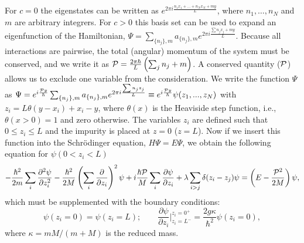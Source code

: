 \documentclass[twocolumn,amsmath,amssymb,showpacs,prl,superscriptaddress,aps]{revtex4-1}
\begin{document}
For $c=0$ the eigenstates can be written as $e^{2\pi i \frac{n_1x_1+\ldots+n_N x_N+my}{L}}$, where $n_1,\ldots,n_N$ and $m$ are arbitrary integrers. 
For $c>0$ this basis set can be used to expand an eigenfunction of the Hamiltonian, $\Psi=\sum_{\{n_j\},m} a_{\{n_j\},m}e^{2\pi i \frac{\sum n_jx_j+my}{L}}$. 
Because all interactions are pairwise, 
the total (angular) momentum of the system must be conserved, and we write it as ${\cal P}=\frac{2\pi\hbar}{L}\left(\sum_{j} n_j+m\right)$.
A conserved quantity (${\cal P}$) allows us to exclude one variable from the consideration. 
We write the function $\Psi$ as $\Psi=e^{i \frac{{\cal P} y}{\hbar}}\sum_{\{n_j\},m} a_{\{n_j\},m}e^{2\pi i \frac{\sum n_jz_j}{L}}\equiv e^{i \frac{{\cal P} y}{\hbar}} \psi(z_1,...,z_N)$ 
with $z_i=L\theta(y-x_i)+x_i-y$, where $\theta(x)$ is the Heaviside step function, i.e., 
$\theta(x>0) = 1$ and zero otherwise. The variables $z_i$ are defined such that $0\leq z_i \leq L$ and the impurity is placed at $z=0$ ($z=L$). Now if we insert this 
function into the Schr{\"o}dinger equation, $H\Psi=E\Psi$, we obtain the following equation for $\psi(0<z_i<L)$
\begin{equation}
-\frac{\hbar^2}{2m}\sum_i\frac{\partial^2 \psi}{\partial z_i^2}-\frac{\hbar^2}{2M}\left(\sum_{i}\frac{\partial }{\partial z_i}\right)^2\psi
+ i \frac{\hbar {\cal P}}{M}\sum_{i}\frac{\partial \psi}{\partial z_i}+\lambda \sum_{i>j}\delta(z_i-z_j)\psi=\left(E-\frac{{\cal P}^2}{2M}\right)\psi,
\end{equation}
which must be supplemented with the boundary conditions:
\begin{equation}
\psi(z_i=0)=\psi(z_i=L); \qquad \frac{\partial \psi}{\partial z_i}\bigg|^{z_i=0^+}_{z_i=L^-}= \frac{2 g \kappa}{\hbar^2} \psi(z_i=0),
\end{equation}
where $\kappa=mM/(m+M)$ is the reduced mass.
\end{document}
